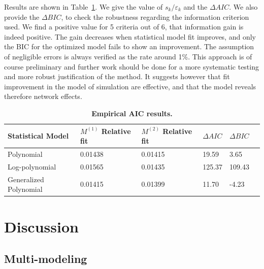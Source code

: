 \documentclass[Royal,sageh,times]{sagej}
\begin{document}
Results  are shown in Table~\ref{tab:empiricalaic}. We give the value of $s_k / \varepsilon_k$ and the $\Delta AIC$. We also provide the $\Delta BIC$,  to check the robustness regarding the information criterion used. We find a positive value for 5 criteria out of 6,  that information gain is indeed positive. The gain decreases when statistical model fit improves, and only the BIC for the optimized model fails to show an improvement. The assumption of negligible errors is always verified as the rate  around 1\%. This approach is of course preliminary and further work should be done for a more systematic testing and  more robust justification of the method. It suggests however that fit improvement in the model of simulation are effective, and that the model reveals therefore network effects.


\begin{table}[ht]
\small\sf\centering
\caption{\textbf{Empirical AIC results.}}\label{tab:empiricalaic}
\begin{tabular}{|l|l|l|l|l|l}
\toprule
Statistical Model & $M^{(1)}$ Relative fit & $M^{(2)}$ Relative fit & $\Delta AIC$ & $\Delta BIC$\\
\midrule
Polynomial & 0.01438 & 0.01415 & 19.59 & 3.65\\
Log-polynomial & 0.01565  & 0.01435 & 125.37 & 109.43\\
Generalized Polynomial & 0.01415  & 0.01399 & 11.70 & -4.23\\
\bottomrule
\end{tabular}
\end{table}







\section*{Discussion}


\subsection*{Multi-modeling}
\end{document}
